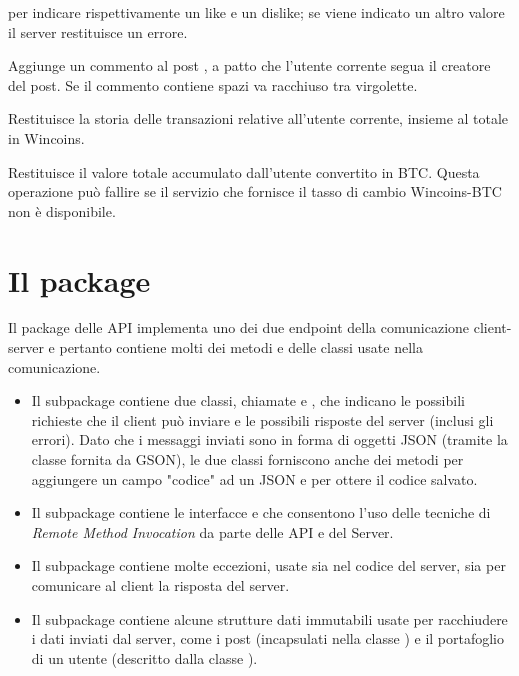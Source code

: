 \documentclass[
    oneside,
    10pt,
    language=italian,
    a4paper,
    article
]{notes}
\begin{document}
\begin{description}
        per indicare rispettivamente un like e un dislike; se viene indicato un
        altro valore il server restituisce un errore. 
    \item[\mono{comment <idPost> <contents>}] Aggiunge un commento al post
        , a patto che l'utente corrente segua il creatore del post.
        Se il commento contiene spazi va racchiuso tra virgolette.
    \item[\mono{wallet}] Restituisce la storia delle transazioni relative 
        all'utente corrente, insieme al totale in Wincoins.
    \item[\mono{wallet btc}] Restituisce il valore totale accumulato dall'utente
        convertito in BTC. Questa operazione può fallire se il servizio che
        fornisce il tasso di cambio Wincoins-BTC non è disponibile.   
\end{description}

\section{Il package }
Il package delle API implementa uno dei due endpoint della comunicazione 
client-server e pertanto contiene molti dei metodi e delle classi usate
nella comunicazione. \begin{itemize}
    \item Il subpackage  contiene due classi, chiamate
         e , che indicano le possibili
        richieste che il client può inviare e le possibili risposte del server
        (inclusi gli errori). Dato che i messaggi inviati sono in forma di oggetti
        JSON (tramite la classe  fornita da GSON), le due classi
        forniscono anche dei metodi per aggiungere un campo "codice" ad un JSON
        e per ottere il codice salvato.
    \item Il subpackage  contiene le interfacce
         e  che consentono l'uso
        delle tecniche di \emph{Remote Method Invocation} da parte delle API
        e del Server.
    \item Il subpackage  contiene molte eccezioni,
        usate sia nel codice del server, sia per comunicare al client la risposta
        del server.
    \item Il subpackage  contiene alcune strutture
        dati immutabili usate per racchiudere i dati inviati dal server, come
        i post (incapsulati nella classe ) e il portafoglio di
        un utente (descritto dalla classe ).
\end{itemize}
\end{document}
